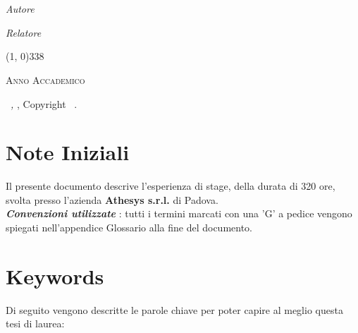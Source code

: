 \documentclass[12pt,a4paper,twoside,openany,english]{book}
\begin{document}
\begin{titlepage}
\begin{center}
		\LARGE{\textsc{\textbf{\myTitle}}}\\
		\large{\mySubTitle}\\
		\vfill
		\begin{minipage}{0.4\textwidth}
			\begin{flushleft} \large
				\emph{Autore}\\
				\myName
			\end{flushleft}
		\end{minipage}
		\hfill
		\begin{minipage}{0.4\textwidth}
			\begin{flushright} \large
				\emph{Relatore} \\
				\myProf
			\end{flushright}
		\end{minipage}
		\vfill
		\line(1, 0){338} \\
		\begin{normalsize}
			\textsc{Anno Accademico \myAA}
		\end{normalsize}
	\end{center}
\end{titlepage}

\thispagestyle{empty}
\hfill
\vfill
\noindent \myName\ \textit{\myTitle,} \myDegree, Copyright \textcopyright\ \myTime.

\cleardoublepage

\chapter*{Note Iniziali}\label{notes}
Il presente documento descrive l'esperienza di stage, della durata di 320 ore, svolta presso l'azienda \textbf{Athesys s.r.l.} di Padova.\\

\textit{\textbf{Convenzioni utilizzate}} : tutti i termini marcati con una 'G' a
pedice vengono spiegati nell'appendice Glossario alla fine del documento.\\
\chapter*{Keywords}\label{keywords}
Di seguito vengono descritte le parole chiave per poter capire al meglio questa tesi di laurea:
\end{document}
